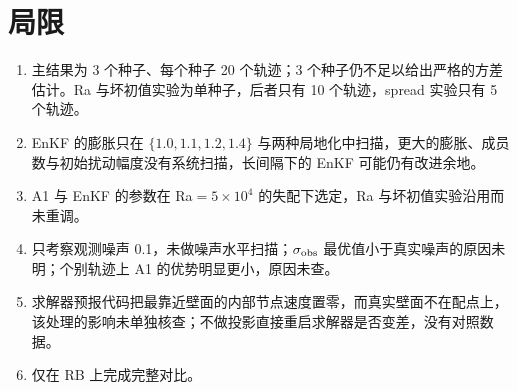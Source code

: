 \documentclass[10.5pt,a4paper]{article}
\begin{document}
\section{局限}
\begin{enumerate}
\item 主结果为 3 个种子、每个种子 20 个轨迹；3 个种子仍不足以给出严格的方差估计。Ra 与坏初值实验为单种子，后者只有 10 个轨迹，spread 实验只有 5 个轨迹。
\item EnKF 的膨胀只在 $\{1.0,1.1,1.2,1.4\}$ 与两种局地化中扫描，更大的膨胀、成员数与初始扰动幅度没有系统扫描，长间隔下的 EnKF 可能仍有改进余地。
\item A1 与 EnKF 的参数在 Ra$=5\times10^4$ 的失配下选定，Ra 与坏初值实验沿用而未重调。
\item 只考察观测噪声 0.1，未做噪声水平扫描；$\sigma_{\rm obs}$ 最优值小于真实噪声的原因未明；个别轨迹上 A1 的优势明显更小，原因未查。
\item 求解器预报代码把最靠近壁面的内部节点速度置零，而真实壁面不在配点上，该处理的影响未单独核查；不做投影直接重启求解器是否变差，没有对照数据。
\item 仅在 RB 上完成完整对比。
\end{enumerate}
\end{document}
